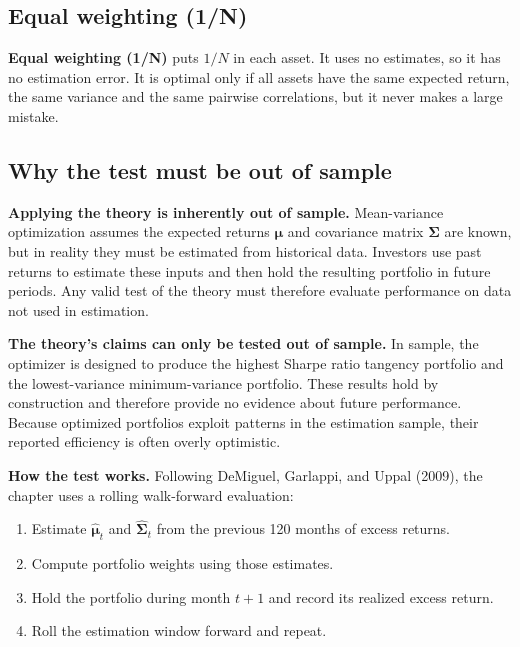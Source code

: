 \subsection{Equal weighting (1/N)}
\label{sec:12-equal}

\textbf{Equal weighting (1/N)} puts $1/N$ in each asset. It uses no estimates, so it has no estimation error. It is optimal only if all assets have the same expected return, the same variance and the same pairwise correlations, but it never makes a large mistake.

\subsection{Why the test must be out of sample}
\label{sec:12-oos}

\textbf{Applying the theory is inherently out of sample.} Mean-variance optimization assumes the expected returns $\boldsymbol{\mu}$ and covariance matrix $\boldsymbol{\Sigma}$ are known, but in reality they must be estimated from historical data. Investors use past returns to estimate these inputs and then hold the resulting portfolio in future periods. Any valid test of the theory must therefore evaluate performance on data not used in estimation.

\textbf{The theory's claims can only be tested out of sample.} In sample, the optimizer is designed to produce the highest Sharpe ratio tangency portfolio and the lowest-variance minimum-variance portfolio. These results hold by construction and therefore provide no evidence about future performance. Because optimized portfolios exploit patterns in the estimation sample, their reported efficiency is often overly optimistic. 

\textbf{How the test works.} Following DeMiguel, Garlappi, and Uppal (2009), the chapter uses a rolling walk-forward evaluation:
\begin{enumerate}
    \item Estimate $\hat{\boldsymbol{\mu}}_t$ and $\hat{\boldsymbol{\Sigma}}_t$ from the previous 120 months of excess returns.
    \item Compute portfolio weights using those estimates.
    \item Hold the portfolio during month $t+1$ and record its realized excess return.
    \item Roll the estimation window forward and repeat.
\end{enumerate}

